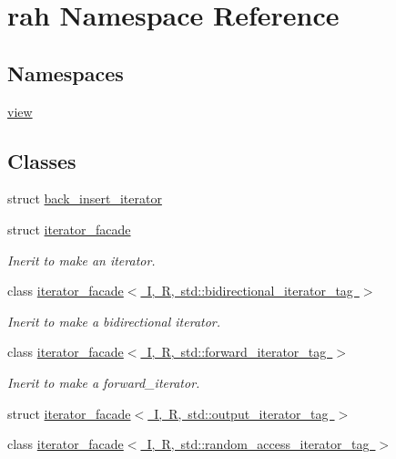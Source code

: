 \hypertarget{namespacerah}{}\section{rah Namespace Reference}
\label{namespacerah}
\subsection*{Namespaces}
\begin{DoxyCompactItemize}
\item 
 \mbox{\hyperlink{namespacerah_1_1view}{view}}
\end{DoxyCompactItemize}
\subsection*{Classes}
\begin{DoxyCompactItemize}
\item 
struct \mbox{\hyperlink{structrah_1_1back__insert__iterator}{back\+\_\+insert\+\_\+iterator}}
\item 
struct \mbox{\hyperlink{structrah_1_1iterator__facade}{iterator\+\_\+facade}}
\begin{DoxyCompactList}\small\item\em Inerit to make an iterator. \end{DoxyCompactList}\item 
class \mbox{\hyperlink{structrah_1_1iterator__facade_3_01_i_00_01_r_00_01std_1_1bidirectional__iterator__tag_01_4}{iterator\+\_\+facade$<$ I, R, std\+::bidirectional\+\_\+iterator\+\_\+tag $>$}}
\begin{DoxyCompactList}\small\item\em Inerit to make a bidirectional iterator. \end{DoxyCompactList}\item 
class \mbox{\hyperlink{structrah_1_1iterator__facade_3_01_i_00_01_r_00_01std_1_1forward__iterator__tag_01_4}{iterator\+\_\+facade$<$ I, R, std\+::forward\+\_\+iterator\+\_\+tag $>$}}
\begin{DoxyCompactList}\small\item\em Inerit to make a forward\+\_\+iterator. \end{DoxyCompactList}\item 
struct \mbox{\hyperlink{structrah_1_1iterator__facade_3_01_i_00_01_r_00_01std_1_1output__iterator__tag_01_4}{iterator\+\_\+facade$<$ I, R, std\+::output\+\_\+iterator\+\_\+tag $>$}}
\item 
class \mbox{\hyperlink{structrah_1_1iterator__facade_3_01_i_00_01_r_00_01std_1_1random__access__iterator__tag_01_4}{iterator\+\_\+facade$<$ I, R, std\+::random\+\_\+access\+\_\+iterator\+\_\+tag $>$}}

\end{DoxyCompactItemize}
